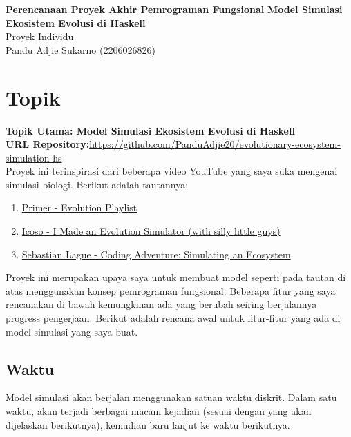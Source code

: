 \documentclass[12pt]{article}
\begin{document}
 
%
\renewcommand{\arraystretch}{1.25}

\begin{center}
    \Large
\textbf{Perencanaan Proyek Akhir Pemrograman Fungsional}
\textbf{Model Simulasi Ekosistem Evolusi di Haskell}\\
Proyek Individu\\
Pandu Adjie Sukarno (2206026826)
\end{center}
\section{Topik}
\noindent \textbf{Topik Utama: Model Simulasi Ekosistem Evolusi di Haskell}\\ 

\noindent\textbf{URL Repository:}\href{https://github.com/PanduAdjie20/evolutionary-ecosystem-simulation-hs}{https://github.com/PanduAdjie20/evolutionary-ecosystem-simulation-hs}\\

\noindent Proyek ini terinspirasi dari beberapa video YouTube yang saya suka mengenai simulasi biologi. Berikut adalah tautannya: 
\begin{enumerate}
    \item \href{https://youtube.com/playlist?list=PLKortajF2dPBWMIS6KF4RLtQiG6KQrTdB&si=hqaZhZ-h92zkJozj}{Primer - Evolution Playlist}
    \item \href{https://youtu.be/f7vH2Li9KOw?si=k78nDUqfp5TPhn00}{Icoso - I Made an Evolution Simulator (with silly little guys)}
    \item \href{https://youtu.be/r_It_X7v-1E?si=YXpYhTIrnf76xXY_}{Sebastian Lague - Coding Adventure: Simulating an Ecosystem}
\end{enumerate}
Proyek ini merupakan upaya saya untuk membuat model seperti pada tautan di atas menggunakan konsep pemrograman fungsional. Beberapa fitur yang saya rencanakan di bawah kemungkinan ada yang berubah seiring berjalannya progress pengerjaan. Berikut adalah rencana awal untuk fitur-fitur yang ada di model simulasi yang saya buat.
\subsection{Waktu}
Model simulasi akan berjalan menggunakan satuan waktu diskrit. Dalam satu waktu, akan terjadi berbagai macam kejadian (sesuai dengan yang akan dijelaskan berikutnya), kemudian baru lanjut ke waktu berikutnya. 
\end{document}
